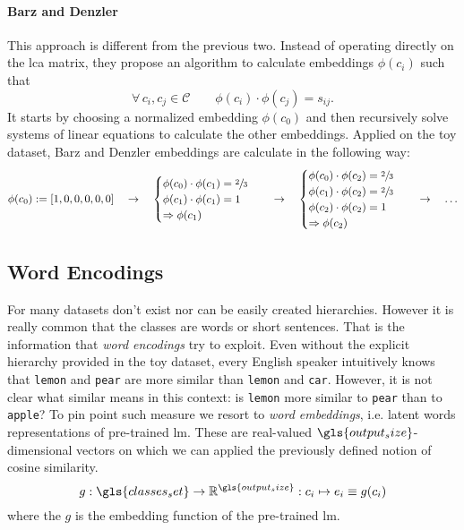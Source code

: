 \paragraph{Barz and Denzler~\cite{HierarchyBasedBarz2018}} This approach is
different from the previous two. Instead of operating directly on the lca
matrix, they propose an algorithm to calculate embeddings $\phi(c_i)$ such that
\begin{equation}
  \forall \, c_i, c_j \in \mathcal{C} \qquad
  \phi(c_i) \cdot \phi(c_j) = s_{ij}.
  \label{eq:bd-hierarchical-encoding}
\end{equation}
It starts by choosing a normalized embedding $\phi(c_0)$ and then recursively
solve systems of linear equations to calculate the other embeddings.
Applied on the toy dataset, Barz and Denzler embeddings are calculate in the
following way:
\begin{equation*}
  \phi{\left(c_0\right)} := \left[1, 0, 0, 0, 0, 0\right]
  \quad \rightarrow \quad
  \begin{cases}
    \phi{\left(c_0\right)} \cdot \phi{\left(c_1\right)} = \sfrac{2}{3} \\
    \phi{\left(c_1\right)} \cdot \phi{\left(c_1\right)} = 1 \\
    \Rightarrow  \phi{\left(c_1\right)}
  \end{cases}
  \quad \rightarrow \quad
  \begin{cases}
    \phi{\left(c_0\right)} \cdot \phi{\left(c_2\right)} = \sfrac{2}{3} \\
    \phi{\left(c_1\right)} \cdot \phi{\left(c_2\right)} = \sfrac{2}{3} \\
    \phi{\left(c_2\right)} \cdot \phi{\left(c_2\right)} = 1 \\
    \Rightarrow \phi{\left(c_2\right)}
  \end{cases}
  \quad \rightarrow \quad \ldots
\end{equation*}

\subsection{Word Encodings}
\label{subsec:word-encoding}
For many datasets don't exist nor can be easily created hierarchies. However it
is really common that the classes are words or short sentences. That is the
information that \emph{word encodings} try to exploit. Even without the explicit
hierarchy provided in the toy dataset, every English speaker intuitively knows
that \texttt{lemon} and \texttt{pear} are more similar than \texttt{lemon} and
\texttt{car}. However, it is not clear what similar means in this context: is
\texttt{lemon} more similar to \texttt{pear} than to \texttt{apple}? To pin
point such measure we resort to \emph{word embeddings}, i.e. latent words
representations of pre-trained \acrshort{lm}. These are real-valued
$\gls{output_size}$-dimensional vectors on which we can applied the previously
defined notion of cosine similarity.
\begin{equation}
  g : \gls{classes_set} \to \mathbb{R}^{\gls{output_size}} :
  c_i \mapsto e_i \equiv g(c_i)
  \label{eq:word-encoding}
\end{equation}
where the $g$ is the embedding function of the pre-trained \acrshort{lm}.


